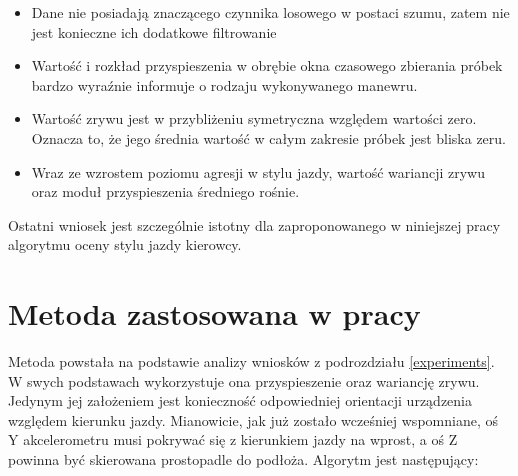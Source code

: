 \begin{itemize}
\item Dane nie posiadają znaczącego czynnika losowego w postaci szumu, zatem nie jest konieczne ich dodatkowe filtrowanie
\item Wartość i rozkład przyspieszenia w obrębie okna czasowego zbierania próbek bardzo wyraźnie informuje o rodzaju wykonywanego manewru.
\item Wartość zrywu jest w przybliżeniu symetryczna względem wartości zero. Oznacza to, że jego średnia wartość w całym zakresie próbek jest bliska zeru.
\item Wraz ze wzrostem poziomu agresji w stylu jazdy, wartość wariancji zrywu oraz moduł przyspieszenia średniego rośnie. 
\end{itemize}

Ostatni wniosek jest szczególnie istotny dla zaproponowanego w niniejszej pracy algorytmu oceny stylu jazdy kierowcy. 

\section{Metoda zastosowana w pracy}

Metoda powstała na podstawie analizy wniosków z podrozdziału \ref{experiments}. W swych podstawach wykorzystuje ona przyspieszenie oraz wariancję zrywu. Jedynym  jej założeniem jest konieczność odpowiedniej orientacji urządzenia względem kierunku jazdy. Mianowicie, jak już zostało wcześniej wspomniane, oś Y akcelerometru musi pokrywać się z kierunkiem jazdy na wprost, a oś Z powinna być skierowana prostopadle do podłoża. Algorytm jest następujący:


